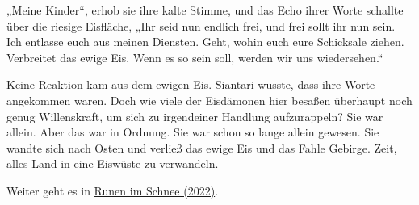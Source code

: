 „Meine Kinder“, erhob sie ihre kalte Stimme, und das Echo ihrer Worte schallte über die riesige Eisfläche, „Ihr seid nun endlich frei, und frei sollt ihr nun sein. Ich entlasse euch aus meinen Diensten. Geht, wohin euch eure Schicksale ziehen. Verbreitet das ewige Eis. Wenn es so sein soll, werden wir uns wiedersehen.“

Keine Reaktion kam aus dem ewigen Eis. Siantari wusste, dass ihre Worte angekommen waren. Doch wie viele der Eisdämonen hier besaßen überhaupt noch genug Willenskraft, um sich zu irgendeiner Handlung aufzurappeln? Sie war allein. Aber das war in Ordnung. Sie war schon so lange allein gewesen. Sie wandte sich nach Osten und verließ das ewige Eis und das Fahle Gebirge. Zeit, alles Land in eine Eiswüste zu verwandeln.

\begin{commentbox}
    Weiter geht es in \hyperref[2022-runen-im-schnee]{Runen im Schnee (2022)}.
\end{commentbox}